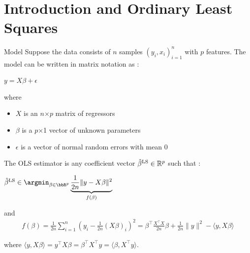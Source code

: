 \documentclass[unknownkeysallowed]{beamer}
\begin{document}




\section{Introduction and Ordinary Least Squares}
\label{sec:introdcution}



\begin{frame}{Model}
Suppose the data consists of $n$ samples $( y_i, x_i )^n_{i=1}$ with $p$ features.
\newline The model can be written in matrix notation as :
\begin{center}
$y=X\beta+\epsilon$
\end{center}
where
 \begin{itemize}
        \item $X$ is an $n$$\times$$p$ matrix of regressors
        \item $\beta$  is a $p$$\times$1 vector of unknown parameters
        \item $\epsilon$ is a vector of normal random errors with mean 0
    \end{itemize}
\end{frame}
\begin{frame}
The OLS estimator is any coefficient vector
$\hat\beta^{\rm LS}\in\mathbb{R}^p$ such that :
\newline
\begin{center}
$\hat\beta^{\rm LS} \in \argmin_{\beta \in \bbR^p}
\underbrace{\frac{1}{2n}\|y-X\beta\|^2 }_{f(\beta)}$
\end{center}
\vspace{0.5cm}

and
\begin{align*}
	f(\beta)
	= \frac{1}{2n}\sum_{i=1}^n (y_{i}-\frac{1}{2n}(X\beta)_{i})^2
	= \beta^{\top}\frac{X^{\top}X}{2n}\beta+\frac{1}{2n}\|y\|^2- \langle y,X\beta\rangle
\end{align*}

\vspace{0.5cm}
where
$\langle y,X\beta\rangle=y^{\top}X\beta=\beta^{\top}X^{\top}y=\langle \beta,X^{\top}y\rangle$.
\end{frame}
\end{document}
